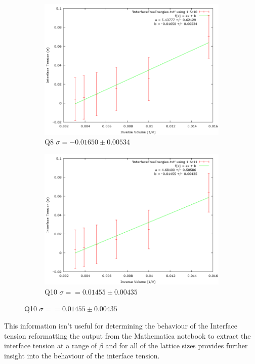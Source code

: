 \begin{figure}[H]
\begin{subfigure}[b]{0.45\textwidth}
    \includegraphics[width=\textwidth]{4-Results/Q8-InterfaceTension.png}
    \caption{Q8 $\sigma = -0.01650 \pm 0.00534$}
\end{subfigure}
\begin{subfigure}[b]{0.45\textwidth}
    \includegraphics[width=\textwidth]{4-Results/Q10-InterfaceTension.png}
    \caption{Q10 $\sigma = =0.01455 \pm 0.00435$}
\end{subfigure}
\end{figure}
This information isn't useful for determining the behaviour of the Interface tension reformatting the output from the Mathematica notebook to extract the interface tension at a range of $\beta$ and for all of the lattice sizes provides further insight into the behaviour of the interface tension.

